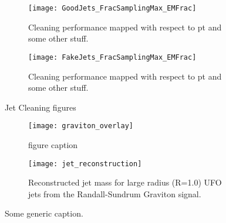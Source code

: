 \documentclass[12pt]{article}
\begin{document}
\begin{figure}[t]
    \centering
    \begin{subfigure}[t]{.45\textwidth}
        \centering
        \texttt{[image: GoodJets\_FracSamplingMax\_EMFrac]}
        \caption{Cleaning performance mapped with respect to pt and some other stuff.}
        \label{subfig:tight_th2}
    \end{subfigure}
    \hfill
    \begin{subfigure}[t]{.45\textwidth}
        \centering
        \texttt{[image: FakeJets\_FracSamplingMax\_EMFrac]}
        \caption{Cleaning performance mapped with respect to pt and some other stuff.}
        \label{subfig:tenacious_th2}
    \end{subfigure} %
\caption{Jet Cleaning figures}
\label{fig:cleaning_performance_subfigure}
\end{figure}

\begin{figure}[t]
    \centering
    \begin{subfigure}[t]{.48\textwidth}
        \centering
        \texttt{[image: graviton\_overlay]}
        \caption{figure caption}
        \label{subfig:graviton_overlay}
    \end{subfigure}
    \hfill
    \begin{subfigure}[t]{.48\textwidth}
        \centering
        \texttt{[image: jet\_reconstruction]}
        \caption{Reconstructed jet mass for large radius (R=1.0) UFO jets from
        the Randall-Sundrum Graviton signal.}
        \label{subfig:ufo_rsg_reconstruction}
    \end{subfigure} %
\caption{Some generic caption.}
\label{fig:some_generic_figure}
\end{figure}

\newpage
\newpage
{}
\end{document}
